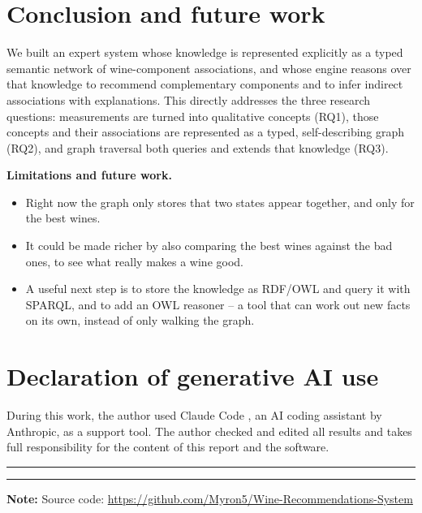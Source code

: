 \documentclass[12pt,a4paper]{article}
\begin{document}
	\section*{Conclusion and future work}
	We built an expert system whose knowledge is represented explicitly as a typed
	semantic network of wine-component associations, and whose engine reasons over
	that knowledge to recommend complementary components and to infer indirect
	associations with explanations. This directly addresses the three research
	questions: measurements are turned into qualitative concepts (RQ1), those
	concepts and their associations are represented as a typed, self-describing graph
	(RQ2), and graph traversal both queries and extends that knowledge (RQ3).

	\textbf{Limitations and future work.}
	\begin{itemize}
		\item Right now the graph only stores that two states appear together, and
		only for the best wines.
		\item It could be made richer by also comparing the best wines against the
		bad ones, to see what really makes a wine good.
		\item A useful next step is to store the knowledge as RDF/OWL and query it
		with SPARQL, and to add an OWL reasoner -- a tool that can work out new facts
		on its own, instead of only walking the graph.
	\end{itemize}

	\section*{Declaration of generative AI use}
	During this work, the author used Claude Code \citep{claudecode2026}, an AI
	coding assistant by Anthropic, as a support tool. The author checked and edited
	all results and takes full responsibility for the content of this report and
	the software.

	
	

	\vspace{0.5cm}
	\hrule
	\vspace{0.3em}
	\hrule
	\vspace{0.5em}
	\begin{center}
		\textbf{Note:} Source code:
		\url{https://github.com/Myron5/Wine-Recommendations-System}
	\end{center}
\end{document}
